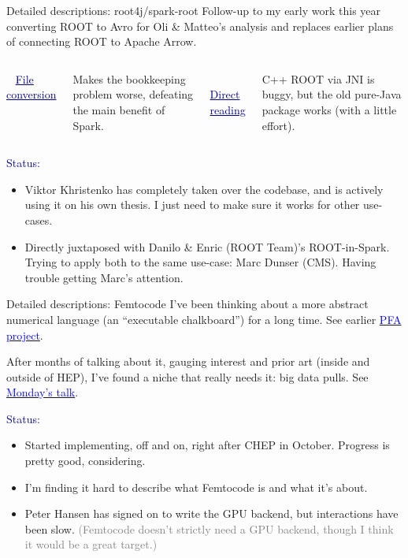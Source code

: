 \documentclass{beamer}
\begin{document}
\begin{frame}{Detailed descriptions: root4j/spark-root}
\vspace{0.5 cm}
Follow-up to my early work this year converting ROOT to Avro for Oli \& Matteo's analysis and replaces earlier plans of connecting ROOT to Apache Arrow.

\vspace{0.3 cm}
\begin{columns}[t]
\mbox{ } \hfill \textcolor{darkblue}{\underline{File conversion}} \hfill \mbox{ }

\vspace{0.1 cm}
Makes the bookkeeping problem worse, defeating the main benefit of Spark.

\mbox{ } \hfill \textcolor{darkblue}{\underline{Direct reading}} \hfill \mbox{ }

\vspace{0.1 cm}
C++ ROOT via JNI is buggy, but the old pure-Java package works (with a little effort).
\end{columns}

\vspace{0.4 cm}
\textcolor{darkblue}{Status:}
\begin{itemize}
\item Viktor Khristenko has completely taken over the codebase, and is actively using it on his own thesis. I just need to make sure it works for other use-cases.
\item Directly juxtaposed with Danilo \& Enric (ROOT Team)'s ROOT-in-Spark. Trying to apply both to the same use-case: Marc Dunser (CMS). Having trouble getting Marc's attention.
\end{itemize}
\end{frame}

\begin{frame}{Detailed descriptions: Femtocode}
\vspace{0.5 cm}
I've been thinking about a more abstract numerical language (an ``executable chalkboard'') for a long time. See earlier \href{http://dmg.org/pfa/}{\textcolor{blue}{PFA project}}.

\vspace{0.3 cm}
After months of talking about it, gauging interest and prior art (inside and outside of HEP), I've found a niche that really needs it: big data pulls. See \href{https://indico.cern.ch/event/594180/}{\textcolor{blue}{Monday's talk}}.

\vspace{0.4 cm}
\textcolor{darkblue}{Status:}
\begin{itemize}
\item Started implementing, off and on, right after CHEP in October. Progress is pretty good, considering.
\item I'm finding it hard to describe what Femtocode is and what it's about.
\item Peter Hansen has signed on to write the GPU backend, but interactions have been slow. \textcolor{gray}{(Femtocode doesn't strictly need a GPU backend, though I think it would be a great target.)}
\end{itemize}
\end{frame}
\end{document}
